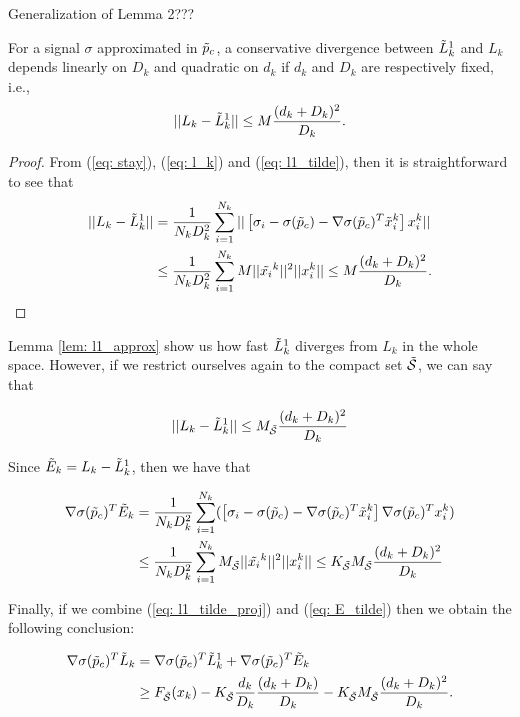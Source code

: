 {\color{red} Generalization of Lemma 2???}
\begin{lemma}
\label{lem: l1_approx}
    For a signal $\sigma$ approximated in $\Tilde p_c$, a conservative divergence between $\Tilde{L}_k^1$ and $L_k$ {\color{red} depends linearly on $D_k$ and quadratic on $d_k$ if $d_k$ and $D_k$ are respectively fixed}, i.e.,
    $$
    ||L_k- \Tilde{L}_k^1|| \leq M \frac{(d_k + D_k)^2}{D_k}.
    $$
\end{lemma}
\begin{proof}
    From (\ref{eq: stay}), (\ref{eq: l_k}) and (\ref{eq: l1_tilde}), then it is straightforward to see that
    \begin{align*}
    ||L_k- \Tilde{L}_k^1||
        & = \frac{1}{N_k D_k^2} \sum^{N_k}_{i=1} || \left[\sigma_i - \sigma(\Tilde p_c) -  \nabla\sigma(\Tilde p_c)^T\Tilde{x}_i^k \right] x_i^k || \\
        &  \leq \frac{1}{N_k D_k^2} \sum^{N_k}_{i=1} M ||\Tilde{x_i}^k||^2 ||x_i^k||
           \leq M \frac{(d_k + D_k)^2}{D_k}.
    \end{align*}
\end{proof}

Lemma \ref{lem: l1_approx} show us how fast $\Tilde{L}^1_k$ diverges from $L_k$ in the whole space. However, if we restrict ourselves again to the compact set $\Tilde{\mathcal{S}}$, we can say that

\begin{equation}
        ||L_k- \Tilde{L}_k^1|| \leq M_{\Tilde{\mathcal{S}}} \frac{(d_k + D_k)^2}{D_k}
\end{equation}

\newpage
Since $\Tilde{E}_k = L_k - \Tilde{L}^1_k$, then we have that

\begin{align}\label{eq: E_tilde}
    \nabla\sigma(\Tilde p_c)^T \Tilde{E}_k & = \frac{1}{N_k D_k^2} \sum^{N_k}_{i=1}
        (\left[\sigma_i - \sigma(\Tilde p_c) -  \nabla\sigma(\Tilde p_c)^T\Tilde{x}_i^k \right] 
        \nabla\sigma(\Tilde p_c)^T x_i^k) \nonumber \\
        & \leq \frac{1}{N_k D_k^2} \sum^{N_k}_{i=1} M_{\Tilde{\mathcal{S}}} ||\Tilde{x_i}^k||^2 ||x_i^k||
        \leq K_{\Tilde{\mathcal{S}}} M_{\Tilde{\mathcal{S}}} \frac{(d_k + D_k)^2}{D_k}
\end{align}

Finally, if we combine (\ref{eq: l1_tilde_proj}) and (\ref{eq: E_tilde}) then we obtain the following conclusion:

\begin{align*}
   \nabla\sigma(\Tilde p_c)^T \Tilde{L}_k 
        & = \nabla\sigma(\Tilde p_c)^T \Tilde{L}^1_k + \nabla\sigma(\Tilde p_c)^T \Tilde{E}_k  \\
        & \geq F_{\Tilde{\mathcal{S}}} (x_k) 
        - K_{\Tilde{\mathcal{S}}} \frac{d_k}{D_k} \frac{(d_k + D_k)}{D_k} 
        - K_{\Tilde{\mathcal{S}}} M_{\Tilde{\mathcal{S}}} \frac{(d_k + D_k)^2}{D_k}.
\end{align*}

